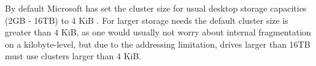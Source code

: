 By default Microsoft has set the cluster size for usual desktop storage capacities (2GB - 16TB) to $4$ KiB \cite{microsoftinc:2018:DCS}. For larger storage needs the default cluster size is greater than $4$ KiB, as one would usually not worry about internal fragmentation on a kilobyte-level, but due to the addressing limitation, drives larger than 16TB must use clusters larger than $4$ KiB.

